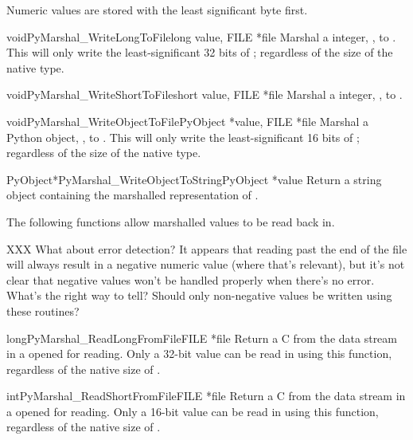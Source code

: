 Numeric values are stored with the least significant byte first.

\begin{cfuncdesc}{void}{PyMarshal_WriteLongToFile}{long value, FILE *file}
  Marshal a  integer, , to .  This
  will only write the least-significant 32 bits of ;
  regardless of the size of the native  type.
\end{cfuncdesc}

\begin{cfuncdesc}{void}{PyMarshal_WriteShortToFile}{short value, FILE *file}
  Marshal a  integer, , to .
\end{cfuncdesc}

\begin{cfuncdesc}{void}{PyMarshal_WriteObjectToFile}{PyObject *value,
                                                     FILE *file}
  Marshal a Python object, , to .  This
  will only write the least-significant 16 bits of ;
  regardless of the size of the native  type.
\end{cfuncdesc}

\begin{cfuncdesc}{PyObject*}{PyMarshal_WriteObjectToString}{PyObject *value}
  Return a string object containing the marshalled representation of
  .
\end{cfuncdesc}

The following functions allow marshalled values to be read back in.

XXX What about error detection?  It appears that reading past the end
of the file will always result in a negative numeric value (where
that's relevant), but it's not clear that negative values won't be
handled properly when there's no error.  What's the right way to tell?
Should only non-negative values be written using these routines?

\begin{cfuncdesc}{long}{PyMarshal_ReadLongFromFile}{FILE *file}
  Return a C  from the data stream in a 
  opened for reading.  Only a 32-bit value can be read in using
  this function, regardless of the native size of .
\end{cfuncdesc}

\begin{cfuncdesc}{int}{PyMarshal_ReadShortFromFile}{FILE *file}
  Return a C  from the data stream in a 
  opened for reading.  Only a 16-bit value can be read in using
  this function, regardless of the native size of .
\end{cfuncdesc}

